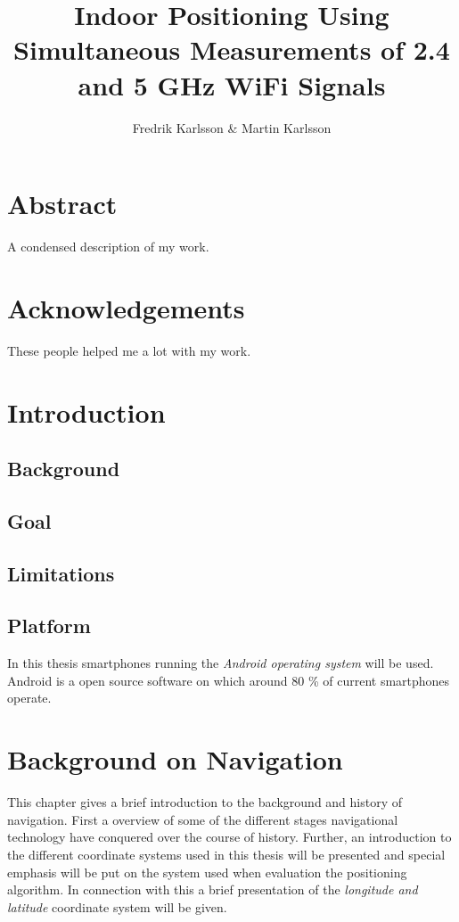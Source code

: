 \documentclass{LTHthesis}
\begin{document}
\begin{titlepages}
\author{Fredrik Karlsson \& Martin Karlsson}
\title{Indoor Positioning Using Simultaneous Measurements of 2.4 and 5 GHz WiFi Signals}%
\end{titlepages}
\chapter*{Abstract}
A condensed description of my work.
\chapter*{Acknowledgements}
These people helped me a lot with my work.
\tableofcontents
\chapter{Introduction}
\section{Background}
\section{Goal}
\section{Limitations}
\section{Platform}
%
In this thesis smartphones running the \emph{Android operating system} will be used. Android is a open source software on which around 80 \% of current smartphones operate. 
%
\chapter{Background on Navigation}
%
This chapter gives a brief introduction to the background and history of navigation. First a overview of some of the different stages navigational technology have conquered over the course of history. Further, an introduction to the different coordinate systems used in this thesis will be presented and special emphasis will be put on the system used when evaluation the positioning algorithm. In connection with this a brief presentation of the \emph{longitude and latitude} coordinate system will be given. 
%
\end{document}
